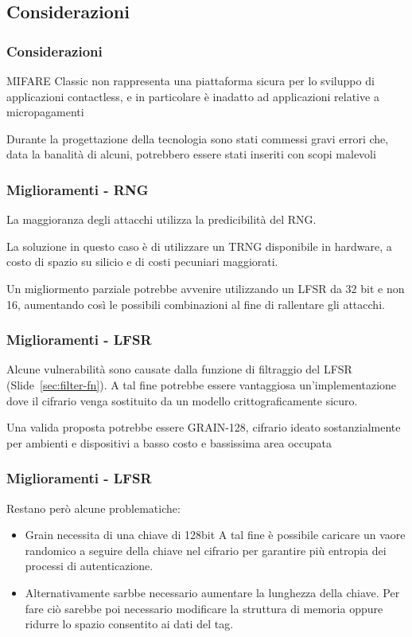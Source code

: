 \subsection{Considerazioni}
\begin{frame}
    \frametitle{Considerazioni}
    MIFARE Classic non rappresenta una piattaforma sicura per lo sviluppo di applicazioni contactless, e in
    particolare è inadatto ad applicazioni relative a micropagamenti\pause

    Durante la progettazione della tecnologia sono stati commessi gravi errori che, data la banalità di alcuni,
    potrebbero essere stati inseriti con scopi malevoli~\cite{Courtois2009TheDS}
\end{frame}

\begin{frame}
    \frametitle{Miglioramenti - RNG}
    La maggioranza degli attacchi utilizza la predicibilità del RNG. \pause
    
    La soluzione in questo caso è di utilizzare un TRNG disponibile in hardware, a costo di spazio su silicio e di costi pecuniari maggiorati.\pause

    Un migliormento parziale potrebbe avvenire utilizzando un LFSR da 32 bit e non 16, aumentando così le possibili combinazioni al fine di rallentare gli attacchi.
\end{frame}

\begin{frame}
    \frametitle{Miglioramenti - LFSR}
    Alcune vulnerabilità sono causate dalla funzione di filtraggio del LFSR (Slide~\ref{sec:filter-fn}).
    A tal fine potrebbe essere vantaggiosa un'implementazione dove il cifrario venga sostituito da un modello crittograficamente sicuro.
    
    Una valida proposta potrebbe essere GRAIN-128, cifrario ideato sostanzialmente per ambienti e dispositivi a basso costo e bassissima area occupata\cite{hell2006stream}\pause
\end{frame}
\begin{frame}
    \frametitle{Miglioramenti - LFSR}
    Restano però alcune problematiche:
    \begin{itemize}
        \item <1-> Grain necessita di una chiave di 128bit\newline
                A tal fine è possibile caricare un vaore randomico a seguire della chiave nel cifrario per garantire più entropia dei processi di autenticazione.
        \item <2-> Alternativamente sarbbe necessario aumentare la lunghezza della chiave. Per fare ciò sarebbe poi necessario modificare la struttura di memoria oppure ridurre lo spazio consentito ai dati del tag.
    \end{itemize}
\end{frame}

